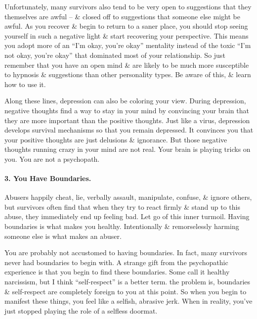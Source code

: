 \documentclass{article}
\numberwithin{equation}{section}
\begin{document}
Unfortunately, many survivors also tend to be very open to suggestions that they themselves are awful -- \& closed off to suggestions that someone else might be awful. As you recover \& begin to return to a saner place, you should stop seeing yourself in such a negative light \& start recovering your perspective. This means you adopt more of an ``I'm okay, you're okay'' mentality instead of the toxic ``I'm not okay, you're okay'' that dominated most of your relationship. So just remember that you have an open mind \& are likely to be much more susceptible to hypnosis \& suggestions than other personality types. Be aware of this, \& learn how to use it.

Along these lines, depression can also be coloring your view. During depression, negative thoughts find a way to stay in your mind by convincing your brain that they are more important than the positive thoughts. Just like a virus, depression develops survival mechanisms so that you remain depressed. It convinces you that your positive thoughts are just delusions \& ignorance. But those negative thoughts running crazy in your mind are not real. Your brain is playing tricks on you. You are not a psychopath.

\paragraph{3. You Have Boundaries.} Abusers happily cheat, lie, verbally assault, manipulate, confuse, \& ignore others, but survivors often find that when they try to react firmly \& stand up to this abuse, they immediately end up feeling bad. Let go of this inner turmoil. Having boundaries is what makes you healthy. Intentionally \& remorselessly harming someone else is what makes an abuser.

You are probably not accustomed to having boundaries. In fact, many survivors never had boundaries to begin with. A strange gift from the psychopathic experience is that you begin to find these boundaries. Some call it healthy narcissism, but I think ``self-respect'' is a better term. the problem is, boundaries \& self-respect are completely foreign to you at this point. So when you begin to manifest these things, you feel like a selfish, abrasive jerk. When in reality, you've just stopped playing the role of a selfless doormat.
\end{document}
